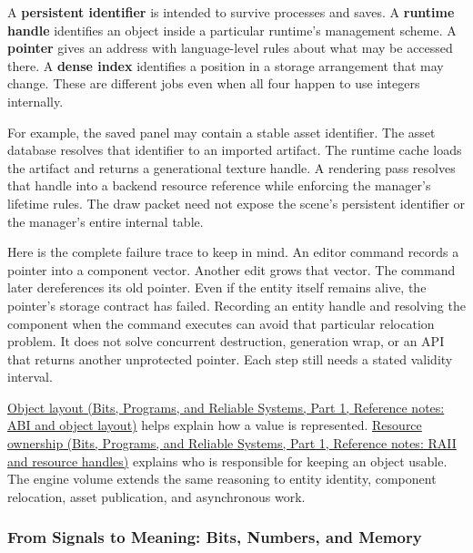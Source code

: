 A \textbf{persistent identifier} is intended to survive processes and saves. A \textbf{runtime handle} identifies an object inside a particular runtime's management scheme. A \textbf{pointer} gives an address with language-level rules about what may be accessed there. A \textbf{dense index} identifies a position in a storage arrangement that may change. These are different jobs even when all four happen to use integers internally.

For example, the saved panel may contain a stable asset identifier. The asset database resolves that identifier to an imported artifact. The runtime cache loads the artifact and returns a generational texture handle. A rendering pass resolves that handle into a backend resource reference while enforcing the manager's lifetime rules. The draw packet need not expose the scene's persistent identifier or the manager's entire internal table.

Here is the complete failure trace to keep in mind. An editor command records a pointer into a component vector. Another edit grows that vector. The command later dereferences its old pointer. Even if the entity itself remains alive, the pointer's storage contract has failed. Recording an entity handle and resolving the component when the command executes can avoid that particular relocation problem. It does not solve concurrent destruction, generation wrap, or an API that returns another unprotected pointer. Each step still needs a stated validity interval.

\href{../01-Bits-Programs-and-Reliable-Systems-P01/main.pdf\#appendix-c4ac6bb0fff8}{Object layout (Bits, Programs, and Reliable Systems, Part 1, Reference notes: ABI and object layout)} helps explain how a value is represented. \href{../01-Bits-Programs-and-Reliable-Systems-P01/main.pdf\#appendix-69739d3ab49b}{Resource ownership (Bits, Programs, and Reliable Systems, Part 1, Reference notes: RAII and resource handles)} explains who is responsible for keeping an object usable. The engine volume extends the same reasoning to entity identity, component relocation, asset publication, and asynchronous work.

\subsubsection{From Signals to Meaning: Bits, Numbers, and Memory}\label{05-engine-i-ch001-from-signals-to-meaning-bits-numbers-and-memory}

\hypertarget{05-engine-i-ch001-from-signals-to-meaning-bits-numbers-and-memory}{}

